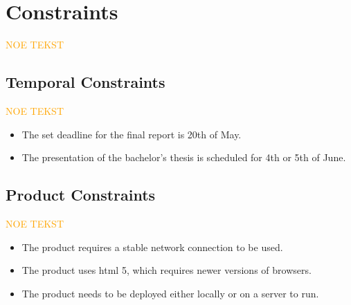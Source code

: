 \begin{itemize}

\end{itemize}

\section{Constraints}

\textcolor{orange}{NOE TEKST}

\subsection{Temporal Constraints}

\textcolor{orange}{NOE TEKST}

\begin{itemize}
    \item The set deadline for the final report is 20th of May.
    \item The presentation of the bachelor's thesis is scheduled for 4th or 5th of June.
\end{itemize}

\subsection{Product Constraints}

\textcolor{orange}{NOE TEKST}

\begin{itemize}
    \item The product requires a stable network connection to be used.
    \item The product uses \acrshort{html} 5, which requires newer versions of browsers.
    \item The product needs to be deployed either locally or on a server to run.
\end{itemize}

